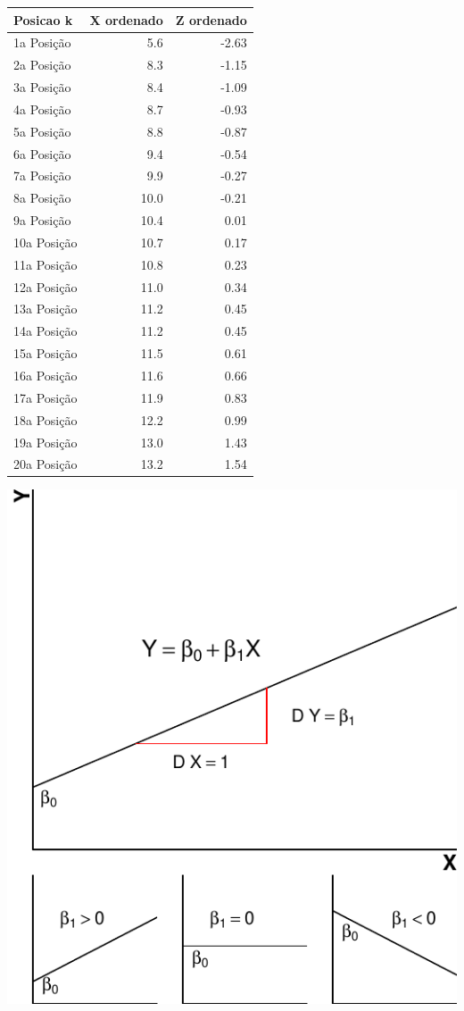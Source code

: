 \documentclass[
]{book}
\begin{document}
\begin{tabular}{l|r|r}
\hline
Posicao k & X ordenado & Z ordenado\\
\hline
1a Posição & 5.6 & -2.63\\
\hline
2a Posição & 8.3 & -1.15\\
\hline
3a Posição & 8.4 & -1.09\\
\hline
4a Posição & 8.7 & -0.93\\
\hline
5a Posição & 8.8 & -0.87\\
\hline
6a Posição & 9.4 & -0.54\\
\hline
7a Posição & 9.9 & -0.27\\
\hline
8a Posição & 10.0 & -0.21\\
\hline
9a Posição & 10.4 & 0.01\\
\hline
10a Posição & 10.7 & 0.17\\
\hline
11a Posição & 10.8 & 0.23\\
\hline
12a Posição & 11.0 & 0.34\\
\hline
13a Posição & 11.2 & 0.45\\
\hline
14a Posição & 11.2 & 0.45\\
\hline
15a Posição & 11.5 & 0.61\\
\hline
16a Posição & 11.6 & 0.66\\
\hline
17a Posição & 11.9 & 0.83\\
\hline
18a Posição & 12.2 & 0.99\\
\hline
19a Posição & 13.0 & 1.43\\
\hline
20a Posição & 13.2 & 1.54\\
\hline
\end{tabular}

\begin{center}\includegraphics{probest-cambientais_files/figure-latex/unnamed-chunk-43-1} \end{center}
\end{document}
